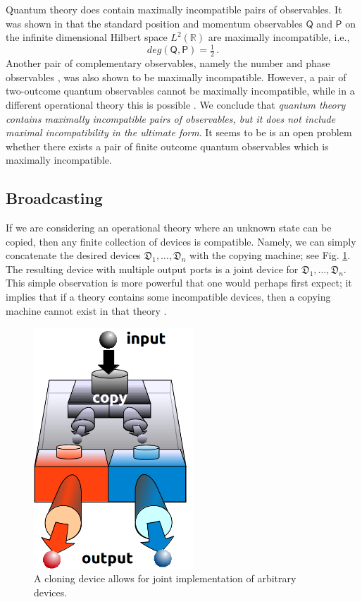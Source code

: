 \documentclass[12pt]{article}
\theoremstyle{definition}
\newcommand{\R}{\mathbb{R}} %
\newcommand{\half}{\tfrac{1}{2}} %
\newcommand{\Po}{\mathsf{P}}%
\newcommand{\Qo}{\mathsf{Q}}%
\newcommand{\Dev}{\mathfrak{D}} %
\begin{document}
Quantum theory does contain maximally incompatible pairs of observables. 
It was shown in \cite{HeScToZi14} that the standard position and momentum observables $\Qo$ and $\Po$ on the infinite dimensional Hilbert space $L^2(\R)$ are maximally incompatible, i.e., 
\begin{equation}\label{eq:pos-mom-true}
deg(\Qo,\Po) = \half \, .
\end{equation}
Another pair of complementary observables, namely the number and phase observables \cite{BuLaPeYl01}, was also shown to be maximally incompatible.
However, a pair of two-outcome quantum observables cannot be maximally incompatible, 
while in a different operational theory this is possible \cite{BuHeScSt13}.
We conclude that \emph{quantum theory contains maximally incompatible pairs of observables, but it does not include maximal incompatibility in the ultimate form}.
It seems to be is an open problem whether there exists a pair of finite outcome quantum observables which is maximally incompatible.


\subsection{Broadcasting}\label{sec:broadcasting}

If we are considering an operational theory where an unknown state can be copied, then any finite collection of devices is compatible. 
Namely, we can simply concatenate the desired devices $\Dev_1,\ldots,\Dev_n$ with the copying machine; see Fig. \ref{fig:cloning}.
The resulting device with multiple output ports is a joint device for $\Dev_1,\ldots,\Dev_n$.
This simple observation is more powerful that one would perhaps first expect; it implies that if a theory contains some incompatible devices, then a copying machine cannot exist in that theory \cite{QI01Werner}.

\begin{figure}\begin{center}
\includegraphics[width=6cm]{fig_cloning.png}
\caption{A cloning device allows for joint implementation of arbitrary devices.}
\label{fig:cloning}
\end{center}
\end{figure}
\end{document}
